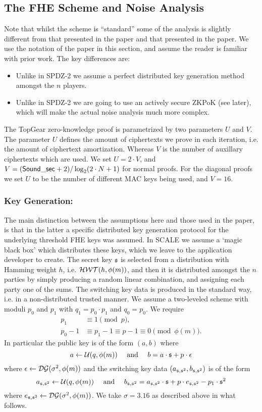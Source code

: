 \subsection{The FHE Scheme and Noise Analysis}
Note that whilst the scheme is ``standard'' some of the
analysis is slightly different from that presented in the \cite{SPDZ2} paper 
and that presented in the \cite{GHS12c} paper.
We use the notation of the \cite{SPDZ2} paper in this section,
and assume the reader is familiar with prior work.
The key differences are:
\begin{itemize}
\item Unlike in SPDZ-2 we assume a perfect distributed key generation method
amongst the $n$ players.
\item Unlike in SPDZ-2 we are going to use an actively secure ZKPoK (see later),
which will make the actual noise analysis much more complex.
\end{itemize}
The TopGear zero-knowledge proof is parametrized by two
parameters $U$ and $V$.
The parameter $U$ defines the amount of ciphertexts we prove in
each iteration, i.e. the amount of ciphertext amortization.
Whereas $V$ is the number of auxillary ciphertexts which are used.
We set $U = 2 \cdot V$, and $V= (\mathsf{Sound\_sec}+2)/\log_2 (2 \cdot N+1)$
for normal proofs.
For the diagonal proofs we set $U$ to be the number of different
MAC keys being used, and $V=16$.


\subsubsection{Key Generation:}
The main distinction between the assumptions here and those used in 
the \cite{SPDZ2} paper, is that in the latter a specific distributed 
key generation protocol for the underlying threshold FHE keys was
assumed. In SCALE we assume a `magic black box' which distributes
these keys, which we leave to the application developer to create.
The secret key $\mathfrak{s}$ is selected from a distribution with
Hamming weight $h$, i.e. $\mathcal{HWT}(h,\phi(m))$, 
and then it is distributed amongst the $n$ parties by simply producing a random 
linear combination, and assigning each party one of the sums.
The switching key data is produced in the standard way, i.e.
in a non-distributed trusted manner.
We assume a two-leveled scheme with moduli $p_0$ and $p_1$ with $q_1=p_0 \cdot p_1$
and $q_0=p_0$.
We require 
\begin{align*}
   p_1 & \equiv 1 \pmod{p}, \\
   p_0 - 1 & \equiv p_1-1 \equiv p-1 \equiv 0 \pmod{\phi(m)}.
\end{align*}
In particular the public key is of the form $(a,b)$ where
\[ a \leftarrow \mathcal{U}(q,\phi(m)) \quad \mbox{ and } \quad b = a \cdot \mathfrak{s} + p \cdot \epsilon \]
where $\epsilon \leftarrow \mathcal{DG}(\sigma^2,\phi(m))$ 
and the switching key data $(a_{\mathfrak{s},\mathfrak{s}^2},b_{\mathfrak{s},\mathfrak{s}^2})$ is of the form
\[ a_{\mathfrak{s},\mathfrak{s}^2} \leftarrow \mathcal{U}(q,\phi(m)) \quad \mbox{ and } \quad 
   b_{\mathfrak{s},\mathfrak{s}^2} =   a_{\mathfrak{s},\mathfrak{s}^2} \cdot \mathfrak{s} + p \cdot e_{\mathfrak{s},\mathfrak{s}^2} - p_1 \cdot \mathfrak{s}^2 \]
where $e_{\mathfrak{s},\mathfrak{s}^2} \leftarrow \mathcal{DG}(\sigma^2,\phi(m))$.
We take $\sigma=3.16$ as described above in what follows.

